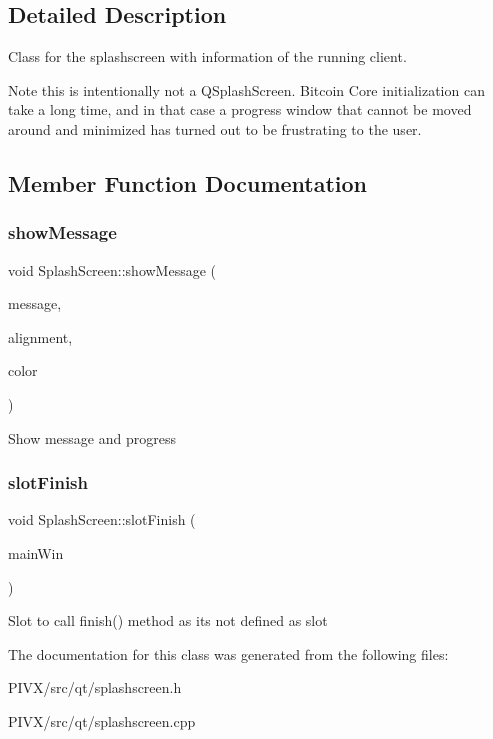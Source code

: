 \subsection{Detailed Description}
Class for the splashscreen with information of the running client.

\begin{DoxyNote}{Note}
this is intentionally not a Q\+Splash\+Screen. Bitcoin Core initialization can take a long time, and in that case a progress window that cannot be moved around and minimized has turned out to be frustrating to the user. 
\end{DoxyNote}


\subsection{Member Function Documentation}
\mbox{\label{class_splash_screen_a16635123e7906390e0aedb7d58ba9923}} 
\subsubsection{\texorpdfstring{show\+Message}{showMessage}}
{\footnotesize\ttfamily void Splash\+Screen\+::show\+Message (\begin{DoxyParamCaption}\item[{const Q\+String \&}]{message,  }\item[{int}]{alignment,  }\item[{const Q\+Color \&}]{color }\end{DoxyParamCaption})\hspace{0.3cm}{\ttfamily [slot]}}

Show message and progress \mbox{\label{class_splash_screen_ace6374d1889d704d4a41316540d9b47d}} 
\subsubsection{\texorpdfstring{slot\+Finish}{slotFinish}}
{\footnotesize\ttfamily void Splash\+Screen\+::slot\+Finish (\begin{DoxyParamCaption}\item[{Q\+Widget $\ast$}]{main\+Win }\end{DoxyParamCaption})\hspace{0.3cm}{\ttfamily [slot]}}

Slot to call finish() method as it\textquotesingle{}s not defined as slot 

The documentation for this class was generated from the following files\+:\begin{DoxyCompactItemize}
\item 
P\+I\+V\+X/src/qt/splashscreen.\+h\item 
P\+I\+V\+X/src/qt/splashscreen.\+cpp\end{DoxyCompactItemize}
